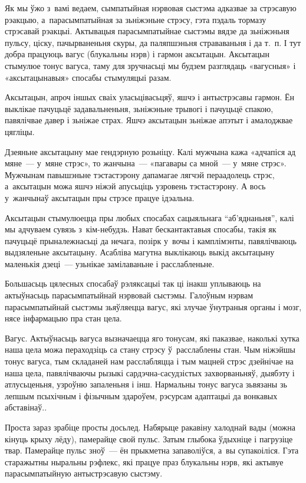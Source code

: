 Як мы ўжо з~вамі ведаем, сымпатыйная нэрвовая сыстэма адказвае за стрэсавую рэакцыю, а~парасымпатыйная за зьніжэньне стрэсу, гэта пэдаль тормазу стрэсавай рэакцыі. Актывацыя парасымпатыйнае сыстэмы вядзе да зьніжэньня пульсу, ціску, пачырваненьня скуры, да паляпшэньня страваваньня і да т.~п. І тут добра працуюць вагус (блукальны нэрв) і гармон аксытацын. Аксытацын стымулюе тонус вагуса, таму для зручнасьці мы будзем разглядаць «вагусныя» і «аксытацынавыя» спосабы стымуляцыі разам.

Аксытацын, апроч іншых сваіх уласьцівасьцяў, яшчэ і антыстрэсавы гармон. Ён выклікае пачуцьцё задавальненьня, зьніжэньне трывогі і пачуцьцё спакою, павялічвае давер і зьніжае страх. Яшчэ аксытацын зьніжае апэтыт і амалоджвае цягліцы. 

Дзеяньне аксытацыну мае гендэрную розьніцу. Калі мужчына кажа «адчапіся ад мяне~--- у~мяне стрэс», то жанчына~--- «пагавары са мной~--- у~мяне стрэс». Мужчынам павышэньне тэстастэрону дапамагае лягчэй пераадолець стрэс, а~аксытацын можа яшчэ ніжэй апусьціць узровень тэстастэрону. А вось у~жанчынаў аксытацын пры стрэсе працуе ідэальна.

Аксытацын стымулюецца пры любых спосабах сацыяльнага ``аб'яднаньня'', калі мы адчуваем сувязь з~кім-небудзь. Нават бескантактавыя спосабы, такія як пачуцьцё прыналежнасьці да нечага, позірк у~вочы і камплімэнты, павялічваюць выдзяленьне аксытацыну. Асабліва магутна выклікаюць выкід аксытацыну маленькія дзеці~--- узьнікае замілаваньне і расслабленьне. 

Большасьць цялесных спосабаў рэляксацыі так ці інакш уплываюць на актыўнасьць парасымпатыйнай нэрвовай сыстэмы. Галоўным нэрвам парасымпатыйнай сыстэмы зьяўляецца вагус, які злучае ўнутраныя органы і мозг, нясе інфармацыю пра стан цела. 

Вагус. Актыўнасьць вагуса вызначаецца яго тонусам, які паказвае, наколькі хутка наша цела можа пераходзіць са стану стрэсу ў~расслаблены стан. Чым ніжэйшы тонус вагуса, тым складаней нам расслабляцца і тым мацней стрэс дзейнічае на наша цела, павялічваючы рызыкі сардэчна-сасудзістых захворваньняў, дыябэту і атлусьценьня, узроўню запаленьня і інш. Нармальны тонус вагуса зьвязаны зь лепшым псыхічным і фізычным здароўем, рэсурсам адаптацыі да вонкавых абставінаў..

Проста зараз зрабіце просты досьлед. Набярыце ракавіну халоднай вады (можна кінуць крыху лёду), памерайце свой пульс. Затым глыбока ўдыхніце і пагрузіце твар. Памерайце пульс зноў~--- ён прыкметна запаволіўся, а~вы супакоіліся. Гэта старажытны ныральны рэфлекс, які працуе праз блукальны нэрв, які актывуе парасымпатыйную антыстрэсавую сыстэму.

